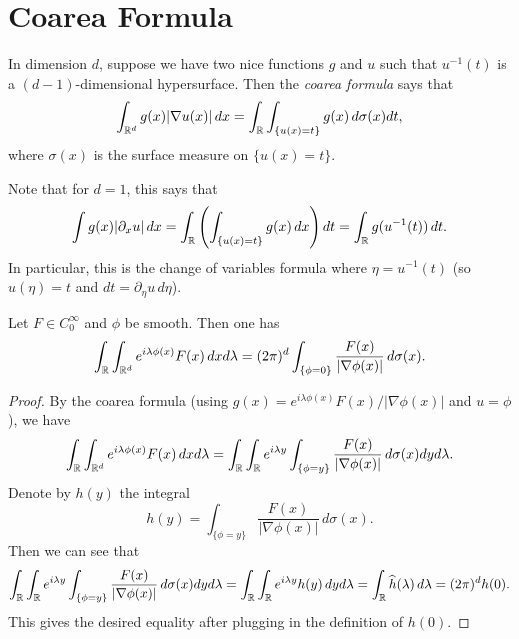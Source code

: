 \section{Coarea Formula}

\begin{remark}
  In dimension $d$, suppose we have two nice functions
  $g$ and $u$ such that $u^{-1}(t)$ is a
  $(d - 1)$-dimensional hypersurface. Then the
  \emph{coarea formula} says that
  \[
    \int_{\mathbb{R}^d} g(x) |\nabla u(x)|\, dx
    = \int_{\mathbb{R}} \int_{\{u(x) = t\}} g(x)\, d\sigma(x) dt,
  \]
  where $\sigma(x)$ is the surface measure on
  $\{u(x) = t\}$.

  Note that for $d = 1$, this says that
  \[
    \int g(x) |\partial_x u|\, dx
    = \int_{\mathbb{R}} \left(\int_{\{u(x) = t\}} g(x)\, dx\right) dt
    = \int_{\mathbb{R}} g(u^{-1}(t))\, dt.
  \]
  In particular, this is the change of
  variables formula where $\eta = u^{-1}(t)$ (so
  $u(\eta) = t$ and $dt = \partial_\eta u\, d \eta$).
\end{remark}

\begin{lemma}
  Let $F \in C_0^\infty$ and $\phi$ be smooth. Then
  one has
  \[
    \int_{\mathbb{R}} \int_{\mathbb{R}^d} e^{i \lambda \phi(x)} F(x)\, dx d\lambda
    = (2\pi)^d \int_{\{\phi = 0\}} \frac{F(x)}{|\nabla \phi(x)|}\, d\sigma(x).
  \]
\end{lemma}

\begin{proof}
  By the coarea formula (using $g(x) = e^{i \lambda \phi(x)} F(x) / |\nabla \phi(x)|$ and $u = \phi$), we have
  \[
    \int_{\mathbb{R}} \int_{\mathbb{R}^d} e^{i\lambda \phi(x)} F(x)\, dx d\lambda
    = \int_{\mathbb{R}} \int_{\mathbb{R}} e^{i \lambda y} \int_{\{\phi = y\}} \frac{F(x)}{|\nabla \phi(x)|}\, d\sigma(x) dy d\lambda.
  \]
  Denote by $h(y)$ the integral
  \[
    h(y) = \int_{\{\phi = y\}} \frac{F(x)}{|\nabla \phi(x)|}\, d\sigma(x).
  \]
  Then we can see that
  \[
    \int_{\mathbb{R}} \int_{\mathbb{R}} e^{i \lambda y} \int_{\{\phi = y\}} \frac{F(x)}{|\nabla \phi(x)|}\, d\sigma(x) dy d\lambda
    = \int_{\mathbb{R}} \int_{\mathbb{R}} e^{i \lambda y} h(y)\, dy d\lambda
    = \int_{\mathbb{R}} \widehat{h}(\lambda)\, d\lambda
    = (2\pi)^d h(0).
  \]
  This gives the desired equality after plugging
  in the definition of $h(0)$.
\end{proof}

